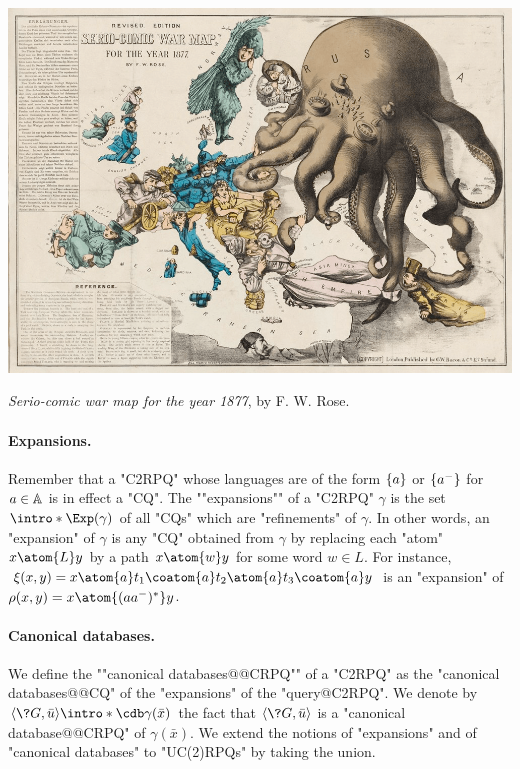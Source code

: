 \begin{marginfigure}[8em]
    \centering
    \includegraphics[width=\linewidth]{fig/prelim-db/Russia.png}
    \caption{\emph{Serio-comic war map for the year 1877}, by F. W. Rose.}
\end{marginfigure}
\paragraph*{Expansions.}
Remember that a "C2RPQ" whose languages are
of the form $\{a\}$ or $\{a^-\}$ for $a \in \mathbb{A}$ is in effect a "CQ".
The \AP""expansions"" of a "C2RPQ" $\gamma$ is the set $\intro*\Exp(\gamma)$ of all "CQs" which are "refinements" of $\gamma$.
In other words, an "expansion" of $\gamma$ is any "CQ" obtained from $\gamma$
by replacing each "atom" $x \atom{L} y$ by a path $x \atom{w} y$ for some
word $w \in L$.
For instance, $\xi(x,y) = x \atom{a} t_1 \coatom{a} t_2 \atom{a} t_3 \coatom{a} y$
is an "expansion" of $\rho(x,y) = x \atom{(aa^-)^*} y$.

\paragraph{Canonical databases.}
We define the \AP""canonical databases@@CRPQ"" of a "C2RPQ" as the "canonical databases@@CQ"
of the "expansions" of the "query@C2RPQ". We denote by
\AP$\tup{\?G,\bar u} \intro*\cdb \gamma(\bar x)$
the fact that $\tup{\?G,\bar u}$ is a "canonical database@@CRPQ" of $\gamma(\bar x)$.
We extend the notions of "expansions" and of "canonical databases" to "UC(2)RPQs" by
taking the union.

